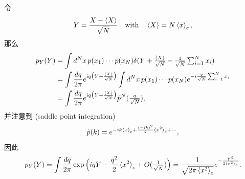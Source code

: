 \begin{itemize}
	\begin{tcolorbox}[title=proof:]
		令
		\begin{equation}
			Y = \frac{X - \braket{X}}{\sqrt{N}} \quad \text{with} \quad \braket{X} = N \braket{x}_c,
		\end{equation}
		那么
		\begin{align}
			p_Y(Y) &= \int d^N x \, p(x_1) \cdots p(x_N) \delta({\textstyle Y + \frac{\braket{X}}{\sqrt{N}} - \frac{1}{\sqrt{N}} \sum_{i = 1}^N x_i}) \notag \\
			&= \int \frac{dq}{2 \pi} e^{i q \big( Y + \frac{\braket{X}}{\sqrt{N}} \big)} \int d^N x \, p(x_1) \cdots p(x_N) e^{- i \frac{q}{\sqrt{N}} \sum_{i = 1}^N x_i} \notag \\
			&= \int \frac{dq}{2 \pi} e^{i q \big( Y + \frac{\braket{X}}{\sqrt{N}} \big)} \tilde{p}^N({\textstyle \frac{q}{\sqrt{N}}}),
		\end{align}
		并注意到 (saddle point integration)
		\begin{equation}
			\tilde{p}(k) = e^{- i k \braket{x}_c + \frac{(- i k)^2}{2} \braket{x^2}_c + \cdots},
		\end{equation}
		因此
		\begin{equation}
			p_Y(Y) = \int \frac{dq}{2 \pi} \exp \Big( i q Y - \frac{q^2}{2} \braket{x^2}_c + O({\textstyle \frac{1}{\sqrt{N}}}) \Big) = \frac{1}{\sqrt{2 \pi \braket{x^2}_c}} e^{- \frac{Y^2}{2 \braket{x^2}_c}}.
		\end{equation}
	\end{tcolorbox}
\end{itemize}
